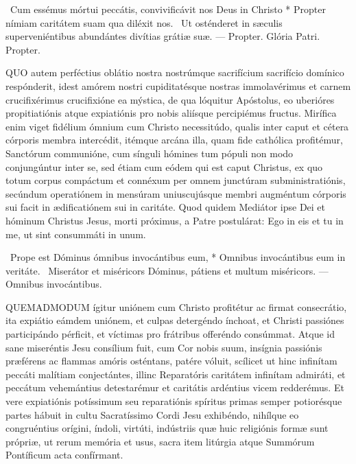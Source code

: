 \R\ Cum essémus mórtui peccátis, convivificávit nos Deus in Christo * Propter nímiam caritátem suam qua diléxit nos. \V\ Ut osténderet in sæculis superveniéntibus abundántes divítias grátiæ suæ. --- Propter. Glória Patri. Propter.




\lettrine[lines=2]{Q}{UO} autem perféctius oblátio nostra nostrúmque sacrifícium sacrifício domínico respónderit, idest amórem nostri cupiditatésque nostras immolavérimus et carnem crucifixérimus crucifixióne ea mýstica, de qua lóquitur Apóstolus, eo uberióres propitiatiónis atque expiatiónis pro nobis aliísque percipiémus fructus. Mirífica enim viget fidélium ómnium cum Christo necessitúdo, qualis inter caput et cétera córporis membra intercédit, itémque arcána illa, quam fide cathólica profitémur, Sanctórum communióne, cum sínguli hómines tum pópuli non modo conjungúntur inter se, sed étiam cum eódem qui est caput Christus, ex quo totum corpus compáctum et connéxum per omnem junctúram subministratiónis, secúndum operatiónem in mensúram uniuscujúsque membri augméntum córporis sui facit in ædificatiónem sui in caritáte. Quod quidem Mediátor ipse Dei et hóminum Christus Jesus, morti próximus, a Patre postulárat: Ego in eis et tu in me, ut sint consummáti in unum.

\R\ Prope est Dóminus ómnibus invocántibus eum, * Omnibus invocántibus eum in veritáte. \V\ Miserátor et miséricors Dóminus, pátiens et multum miséricors. --- Omnibus invocántibus.


\lettrine[lines=2]{Q}{UEMADMODUM} ígitur uniónem cum Christo profitétur ac firmat consecrátio, ita expiátio eámdem uniónem, et culpas detergéndo ínchoat, et Christi passiónes participándo pérficit, et víctimas pro frátribus offeréndo consúmmat. Atque id sane miseréntis Jesu consílium fuit, cum Cor nobis suum, insígnia passiónis præférens ac flammas amóris osténtans, patére vóluit, scílicet ut hinc infinítam peccáti malítiam conjectántes, illinc Reparatóris caritátem infinítam admiráti, et peccátum vehemántius detestarémur et caritátis ardéntius vicem redderémus. Et vere expiatiónis potíssimum seu reparatiónis spíritus primas semper potiorésque partes hábuit in cultu Sacratíssimo Cordi Jesu exhibéndo, nihílque eo congruéntius orígini, índoli, virtúti, indústriis quæ huic religiónis formæ sunt própriæ, ut rerum memória et usus, sacra item litúrgia atque Summórum Pontíficum acta confírmant.

